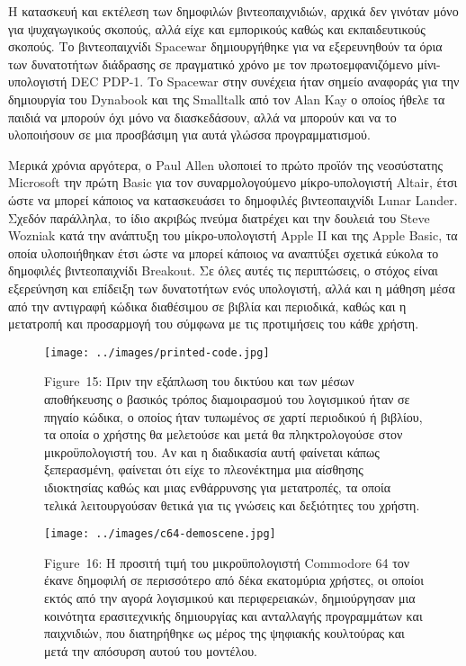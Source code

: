 \documentclass[
]{article}
\begin{document}
Η κατασκευή και εκτέλεση των δημοφιλών βιντεοπαιχνιδιών, αρχικά δεν
γινόταν μόνο για ψυχαγωγικούς σκοπούς, αλλά είχε και εμπορικούς καθώς
και εκπαιδευτικούς σκοπούς. Το βιντεοπαιχνίδι Spacewar δημιουργήθηκε για
να εξερευνηθούν τα όρια των δυνατοτήτων διάδρασης σε πραγματικό χρόνο με
τον πρωτοεμφανιζόμενο μίνι-υπολογιστή DEC PDP-1. Το Spacewar στην
συνέχεια ήταν σημείο αναφοράς για την δημιουργία του Dynabook και της
Smalltalk από τον Alan Kay ο οποίος ήθελε τα παιδιά να μπορούν όχι μόνο
να διασκεδάσουν, αλλά να μπορούν και να το υλοποιήσουν σε μια προσβάσιμη
για αυτά γλώσσα προγραμματισμού.

Μερικά χρόνια αργότερα, ο Paul Allen υλοποιεί το πρώτο προϊόν της
νεοσύστατης Microsoft την πρώτη Basic για τον συναρμολογούμενο
μίκρο-υπολογιστή Altair, έτσι ώστε να μπορεί κάποιος να κατασκευάσει το
δημοφιλές βιντεοπαιχνίδι Lunar Lander. Σχεδόν παράλληλα, το ίδιο ακριβώς
πνεύμα διατρέχει και την δουλειά του Steve Wozniak κατά την ανάπτυξη του
μίκρο-υπολογιστή Apple II και της Apple Basic, τα οποία υλοποιήθηκαν
έτσι ώστε να μπορεί κάποιος να αναπτύξει σχετικά εύκολα το δημοφιλές
βιντεοπαιχνίδι Breakout. Σε όλες αυτές τις περιπτώσεις, ο στόχος είναι
εξερεύνηση και επίδειξη των δυνατοτήτων ενός υπολογιστή, αλλά και η
μάθηση μέσα από την αντιγραφή κώδικα διαθέσιμου σε βιβλία και περιοδικά,
καθώς και η μετατροπή και προσαρμογή του σύμφωνα με τις προτιμήσεις του
κάθε χρήστη.

\leavevmode{}%
\begin{figure}
\hypertarget{fig:printed-code}{%
\centering
\texttt{[image: ../images/printed-code.jpg]}
\caption{Figure~15: Πριν την εξάπλωση του δικτύου και των μέσων
αποθήκευσης ο βασικός τρόπος διαμοιρασμού του λογισμικού ήταν σε πηγαίο
κώδικα, ο οποίος ήταν τυπωμένος σε χαρτί περιοδικού ή βιβλίου, τα οποία
ο χρήστης θα μελετούσε και μετά θα πληκτρολογούσε στον μικροϋπολογιστή
του. Αν και η διαδικασία αυτή φαίνεται κάπως ξεπερασμένη, φαίνεται ότι
είχε το πλεονέκτημα μια αίσθησης ιδιοκτησίας καθώς και μιας ενθάρρυνσης
για μετατροπές, τα οποία τελικά λειτουργούσαν θετικά για τις γνώσεις και
δεξιότητες του χρήστη.}\label{fig:printed-code}
}
\end{figure}

\leavevmode{}%
\begin{figure}
\hypertarget{fig:c64-demoscene}{%
\centering
\texttt{[image: ../images/c64-demoscene.jpg]}
\caption{Figure~16: Η προσιτή τιμή του μικροϋπολογιστή Commodore 64 τον
έκανε δημοφιλή σε περισσότερο από δέκα εκατομύρια χρήστες, οι οποίοι
εκτός από την αγορά λογισμικού και περιφερειακών, δημιούργησαν μια
κοινότητα ερασιτεχνικής δημιουργίας και ανταλλαγής προγραμμάτων και
παιχνιδιών, που διατηρήθηκε ως μέρος της ψηφιακής κουλτούρας και μετά
την απόσυρση αυτού του μοντέλου.}\label{fig:c64-demoscene}
}
\end{figure}
\end{document}
